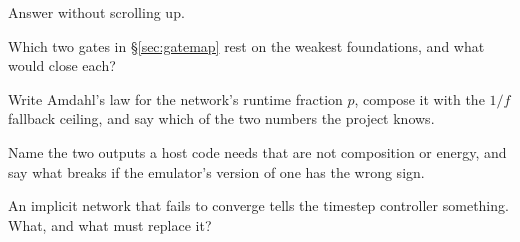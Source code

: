 Answer without scrolling up.

\begin{selfcheck}
\item Which two gates in \S\ref{sec:gatemap} rest on the weakest foundations,
  and what would close each?
\item Write Amdahl's law for the network's runtime fraction $p$, compose it with
  the $1/f$ fallback ceiling, and say which of the two numbers the project
  knows.
\item Name the two outputs a host code needs that are not composition or
  energy, and say what breaks if the emulator's version of one has the wrong
  sign.
\item An implicit network that fails to converge tells the timestep controller
  something. What, and what must replace it?
\end{selfcheck}
